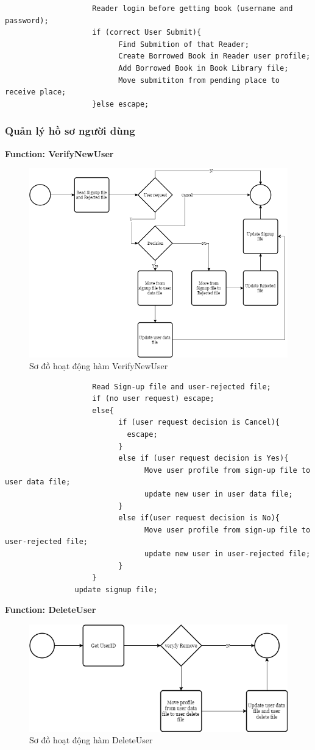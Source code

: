 \documentclass[12pt,a4paper]{report}
\begin{document}
				\begin{verbatim}
					Reader login before getting book (username and password);
					if (correct User Submit){
						  Find Submition of that Reader;
					 	  Create Borrowed Book in Reader user profile;
						  Add Borrowed Book in Book Library file;
						  Move submititon from pending place to receive place;
					}else escape;
				\end{verbatim}
			\subsubsection{Quản lý hồ sơ người dùng}
				\textbf{Function: VerifyNewUser}
				\begin{figure}[H]
					\centering
					\label{F:adduser}
					\includegraphics[scale = .4]{adduser.png}
					\caption{Sơ đồ hoạt động hàm VerifyNewUser}
				\end{figure}
				\begin{verbatim}
					Read Sign-up file and user-rejected file;
					if (no user request) escape;
					else{
						  if (user request decision is Cancel){
							escape;
						  }
						  else if (user request decision is Yes){
							    Move user profile from sign-up file to user data file;
							    update new user in user data file;
						  }
						  else if(user request decision is No){
							    Move user profile from sign-up file to user-rejected file;
							    update new user in user-rejected file;
						  }
					}
				update signup file;
				\end{verbatim}
				\textbf{Function: DeleteUser}
				\begin{figure}[H]
					\centering
					\label{F:deleteuser}
					\includegraphics[scale = .4]{deleteuser.png}
					\caption{Sơ đồ hoạt động hàm DeleteUser}
				\end{figure}
\end{document}
